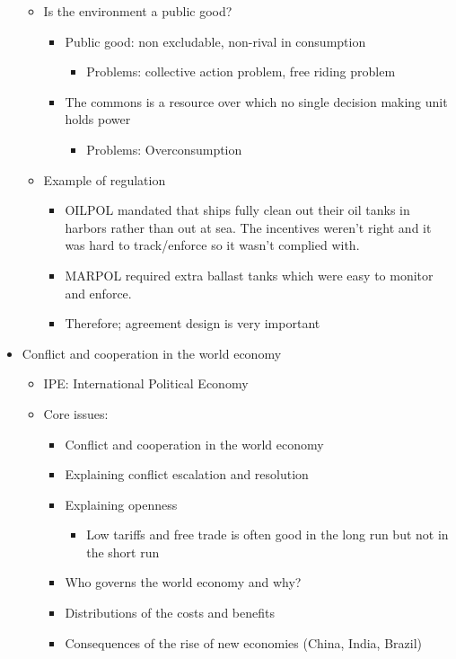 \documentclass[11pt]{article}
\begin{document}
\begin{itemize}
\begin{itemize}
\begin{itemize}
\end{itemize}
\item Is the environment a public good?
\begin{itemize}
\item Public good: non excludable, non-rival in consumption
\begin{itemize}
\item Problems: collective action problem, free riding problem
\end{itemize}
\item The commons is a resource over which no single decision making unit holds
power
\begin{itemize}
\item Problems: Overconsumption
\end{itemize}
\end{itemize}
\item Example of regulation
\begin{itemize}
\item OILPOL mandated that ships fully clean out their oil tanks in harbors
rather than out at sea. The incentives weren't right and it was hard to
track/enforce so it wasn't complied with.
\item MARPOL required extra ballast tanks which were easy to monitor and
enforce.
\item Therefore; agreement design is very important
\end{itemize}
\end{itemize}
\item Conflict and cooperation in the world economy
\begin{itemize}
\item IPE: International Political Economy
\item Core issues:
\begin{itemize}
\item Conflict and cooperation in the world economy
\item Explaining conflict escalation and resolution
\item Explaining openness
\begin{itemize}
\item Low tariffs and free trade is often good in the long run but not in the
short run
\end{itemize}
\item Who governs the world economy and why?
\item Distributions of the costs and benefits
\item Consequences of the rise of new economies (China, India, Brazil)

\end{itemize}
\end{itemize}
\end{itemize}
\end{document}
